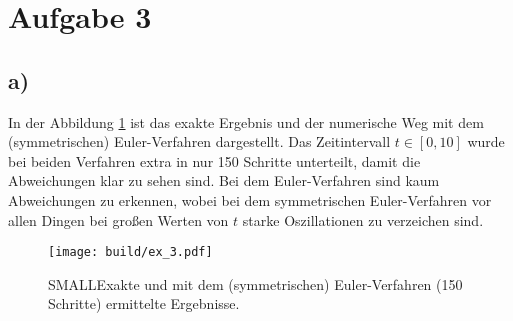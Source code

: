\section*{Aufgabe 3}
\subsection*{a)}
In der Abbildung \ref{fig:euler} ist das exakte Ergebnis und der numerische Weg mit dem (symmetrischen)
Euler-Verfahren dargestellt.
Das Zeitintervall $t \in [0, 10]$ wurde bei beiden Verfahren extra in nur 150 Schritte unterteilt,
damit die Abweichungen klar zu sehen sind.
Bei dem Euler-Verfahren sind kaum Abweichungen zu erkennen, wobei 
bei dem symmetrischen Euler-Verfahren vor allen Dingen bei großen Werten von $t$ 
starke Oszillationen zu verzeichen sind.
\begin{figure}
    \centering
    \texttt{[image: build/ex\_3.pdf]}
    \caption{SMALLExakte und mit dem (symmetrischen) Euler-Verfahren (150 Schritte) ermittelte
    Ergebnisse.}
    \label{fig:euler}
\end{figure}